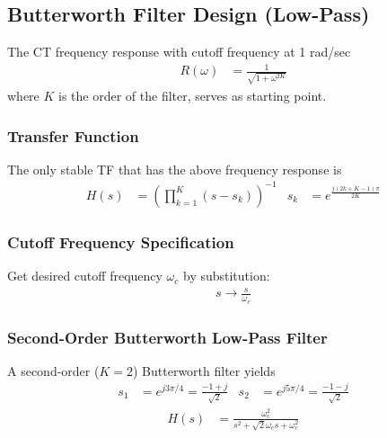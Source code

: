 \subsection{Butterworth Filter Design (Low-Pass)}
The CT frequency response with cutoff frequency at 1 rad/sec
\begin{align*}
	R(\omega) &= \frac{1}{\sqrt{1+\omega^{2K}}}
\end{align*}
where $K$ is the order of the filter, serves as starting point.

\subsubsection{Transfer Function}
The only stable TF that has the above frequency response is
\begin{align*}
	H(s) &= \left(\prod\limits_{k = 1}^{K} (s-s_k)\right)^{-1} & s_k &= e^{\frac{j(2k + K -1)\pi}{2K}}
\end{align*}

\subsubsection{Cutoff Frequency Specification}
Get desired cutoff frequency $\omega_c$ by substitution:
\begin{align*}
	s \to \frac{s}{\omega_c}
\end{align*}

\subsubsection{Second-Order Butterworth Low-Pass Filter}
A second-order ($K=2$) Butterworth filter yields
\begin{align*}
	s_1 &= e^{j 3\pi/4} = \frac{-1+j}{\sqrt{2}} & s_2 &= e^{j 5 \pi/4} = \frac{-1-j}{\sqrt{2}}
\end{align*}
\begin{align*}
	H(s) &= \frac{\omega_c^2}{s^2+\sqrt{2} \omega_c s + \omega_c^2}
\end{align*}